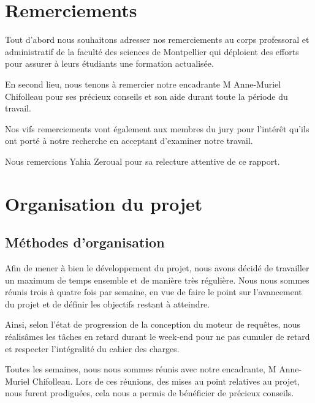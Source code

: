 \documentclass[oneside,13pt,a4paper]{report}
\begin{document}
\chapter*{Remerciements}
\begin{center}

Tout d'abord nous souhaitons adresser nos remerciements au corps professoral et administratif de la faculté des sciences de Montpellier qui déploient des efforts pour assurer à leurs étudiants une formation actualisée.

En second lieu, nous tenons à remercier notre encadrante M Anne-Muriel Chifolleau pour ses précieux conseils et son aide durant toute la période du travail.

Nos vifs remerciements vont également aux membres du jury pour l’intérêt qu’ils ont porté à notre recherche en acceptant d’examiner notre travail.

Nous remercions Yahia Zeroual pour sa relecture attentive de ce rapport.

\end{center}

\parskip=0pt
\tableofcontents

\parskip=5pt

\chapter{Organisation du projet}
\section{Méthodes d’organisation}

Afin de mener à bien le développement du projet, nous avons décidé de travailler un maximum de temps ensemble et de manière très régulière. Nous nous sommes réunis trois à quatre fois par semaine, en vue de faire le point sur l'avancement du projet et de définir les objectifs restant à atteindre.

Ainsi, selon l'état de progression de la conception du moteur de requêtes, nous réalisâmes les tâches en retard durant le week-end pour ne pas cumuler de retard et respecter l'intégralité du cahier des charges.

Toutes les semaines, nous nous sommes réunis avec notre encadrante, M Anne-Muriel Chifolleau. Lors de ces réunions, des mises au point relatives au projet, nous furent prodiguées, cela nous a permis de bénéficier de précieux conseils.
\end{document}
